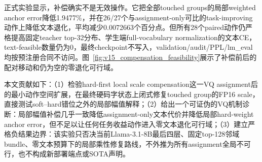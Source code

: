 正式实验显示，补偿确实不是无效操作。它把全部touched groups的局部weighted anchor error降低1.9477\%，并在26/27个与assignment-only可比的task-improving动作上降低文本退化，平均减少0.0072663个百分点。但所有28个paired动作仍严格提高固定teacher top-32分布、学生端full-vocabulary normalization的文本CE，text-feasible数量仍为0，最终checkpoint不写入，validation/audit/PPL/lm\_eval均按预注册合同不访问。图~\ref{fig:v15_compensation_feasibility}展示了补偿前后的配对移动和仍为空的零退化可行域。

本文贡献如下：（1）检验hard-first local scale compensation这一VQ assignment后的最小动作空间扩展，在最终硬码字状态上闭式修复touched group的FP16 scale，直接测试soft--hard错位之外的局部幅值解释；（2）给出一个可证伪的VQ机制诊断：局部幅值补偿几乎一致降低assignment-only文本代价并降低局部hard-weight anchor error，但不足以让任何任务收益动作进入零文本退化可行域；（3）建立严格负结果边界：该实验只否决当前Llama-3.1-8B最后四层、固定top-128邻域bundle、零文本预算下的局部乘性修复路线，不外推为所有assignment全局不可行，也不构成新部署端点或SOTA声明。
